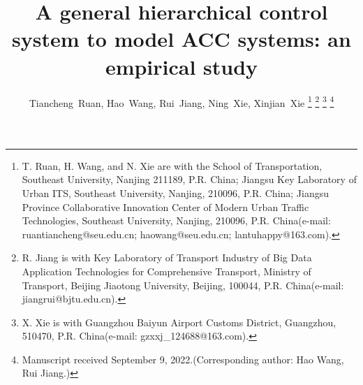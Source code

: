 \documentclass[journal]{IEEEtran}
\begin{document}



\title {A general hierarchical control system to model ACC systems: an empirical study}




%
\author{Tiancheng~Ruan,
  Hao~Wang,
  Rui~Jiang,
  Ning~Xie,
  Xinjian~Xie
  \thanks{T. Ruan,  H. Wang, and N. Xie are with the
    School of Transportation, Southeast University, Nanjing 211189, P.R. China;
    Jiangsu Key Laboratory of Urban ITS, Southeast University, Nanjing, 210096, P.R. China;
    Jiangsu Province Collaborative Innovation Center of Modern Urban Traffic Technologies, Southeast University, Nanjing, 210096, P.R. China(e-mail: ruantiancheng@seu.edu.cn;  haowang@seu.edu.cn; lantuhappy@163.com).}%
  \thanks{R. Jiang is with Key Laboratory of Transport Industry of Big Data Application Technologies for Comprehensive Transport, Ministry of Transport, Beijing Jiaotong University, Beijing, 100044, P.R. China(e-mail: jiangrui@bjtu.edu.cn).}
  \thanks{X. Xie is with Guangzhou Baiyun Airport Customs District, Guangzhou, 510470, P.R. China(e-mail: gzxxj\_124688@163.com).}
  \thanks{Manuscript received September 9, 2022.(Corresponding author: Hao Wang, Rui Jiang.)}}



\end{document}
